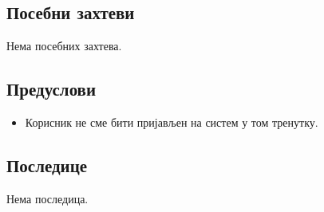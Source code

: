 \documentclass[12pt,a4paper]{article}
\begin{document}
\subsection{Посебни захтеви}
Нема посебних захтева.
\subsection{Предуслови}
 \begin{itemize}
     \item Корисник не сме бити пријављен на систем у том тренутку.
 \end{itemize}
 
\subsection{Последице}
Нема последица.
\end{document}
